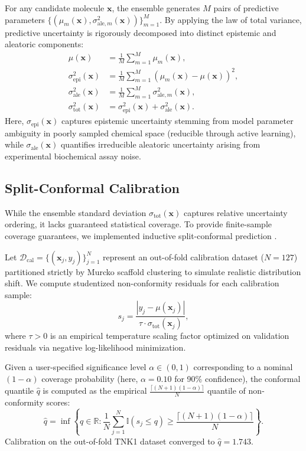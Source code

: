 \documentclass[journal]{IEEEtran}
\begin{document}
For any candidate molecule $\mathbf{x}$, the ensemble generates $M$ pairs of predictive parameters $\{(\mu_m(\mathbf{x}), \sigma_{\text{ale}, m}^2(\mathbf{x}))\}_{m=1}^M$. By applying the law of total variance, predictive uncertainty is rigorously decomposed into distinct epistemic and aleatoric components:
\begin{align}
    \mu(\mathbf{x}) &= \frac{1}{M}\sum_{m=1}^M \mu_m(\mathbf{x}), \label{eq:ens_mean} \\
    \sigma_{\text{epi}}^2(\mathbf{x}) &= \frac{1}{M}\sum_{m=1}^M \left(\mu_m(\mathbf{x}) - \mu(\mathbf{x})\right)^2, \label{eq:ens_epi} \\
    \sigma_{\text{ale}}^2(\mathbf{x}) &= \frac{1}{M}\sum_{m=1}^M \sigma_{\text{ale}, m}^2(\mathbf{x}), \label{eq:ens_ale} \\
    \sigma_{\text{tot}}^2(\mathbf{x}) &= \sigma_{\text{epi}}^2(\mathbf{x}) + \sigma_{\text{ale}}^2(\mathbf{x}). \label{eq:ens_tot}
\end{align}
Here, $\sigma_{\text{epi}}(\mathbf{x})$ captures epistemic uncertainty stemming from model parameter ambiguity in poorly sampled chemical space (reducible through active learning), while $\sigma_{\text{ale}}(\mathbf{x})$ quantifies irreducible aleatoric uncertainty arising from experimental biochemical assay noise.

\subsection{Split-Conformal Calibration}
While the ensemble standard deviation $\sigma_{\text{tot}}(\mathbf{x})$ captures relative uncertainty ordering, it lacks guaranteed statistical coverage. To provide finite-sample coverage guarantees, we implemented inductive split-conformal prediction \cite{vovk2005algorithmic, angelopoulos2021gentle}.

Let $\mathcal{D}_{\text{cal}} = \{(\mathbf{x}_j, y_j)\}_{j=1}^N$ represent an out-of-fold calibration dataset ($N = 127$) partitioned strictly by Murcko scaffold clustering to simulate realistic distribution shift. We compute studentized non-conformity residuals for each calibration sample:
\begin{equation}
    s_j = \frac{|y_j - \mu(\mathbf{x}_j)|}{\tau \cdot \sigma_{\text{tot}}(\mathbf{x}_j)},
\end{equation}
where $\tau > 0$ is an empirical temperature scaling factor optimized on validation residuals via negative log-likelihood minimization.

Given a user-specified significance level $\alpha \in (0, 1)$ corresponding to a nominal $(1 - \alpha)$ coverage probability (here, $\alpha = 0.10$ for 90\% confidence), the conformal quantile $\hat{q}$ is computed as the empirical $\frac{\lceil(N+1)(1-\alpha)\rceil}{N}$ quantile of non-conformity scores:
\begin{equation}
    \hat{q} = \inf\left\{ q \in \mathbb{R} : \frac{1}{N}\sum_{j=1}^N \mathbb{I}(s_j \le q) \ge \frac{\lceil(N+1)(1-\alpha)\rceil}{N} \right\}.
\end{equation}
Calibration on the out-of-fold TNK1 dataset converged to $\hat{q} = 1.743$.
\end{document}

